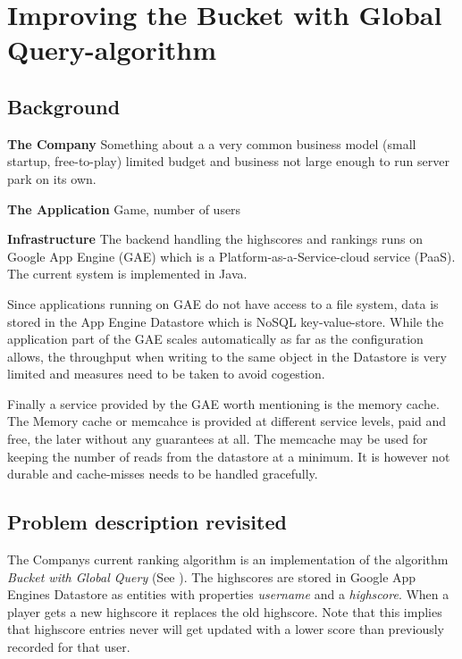 \chapter{\label{method}Improving the Bucket with Global Query-algorithm}


\section{Background}

\textbf{The Company}  Something about a a very common business model (small startup, free-to-play) limited budget and business not large enough to run server park on its own.

\textbf{The Application} Game, number of users

\textbf{Infrastructure} The backend handling the highscores and rankings runs on Google App Engine (GAE) which is a Platform-as-a-Service-cloud service (PaaS). The current system is implemented in Java.

Since applications running on GAE do not have access to a file system, data is stored in the App Engine Datastore which is NoSQL key-value-store. While the application part of the GAE scales automatically as far as the configuration allows, the throughput when writing to the same object in the Datastore is very limited and measures need to be taken to avoid cogestion. 

Finally a service provided by the GAE worth mentioning is the memory cache. The Memory cache or memcahce is provided at different service levels, paid and free, the later without any guarantees at all. The memcache may be used for keeping the number of reads from the datastore at a minimum. It is however not durable and cache-misses needs to be handled gracefully.

\section{Problem description revisited}

The Companys current ranking algorithm is an implementation of the algorithm \emph{Bucket with Global Query} (See ). The highscores are stored in Google App Engines Datastore as entities with properties \emph{username} and a \emph{highscore}. When a player gets a new highscore it replaces the old highscore. Note that this implies that highscore entries never will get updated with a lower score than previously recorded for that user.

